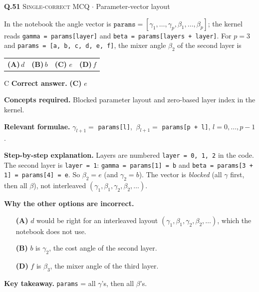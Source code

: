 \documentclass[11pt,a4paper]{article}
\newcommand{\optlabel}[1]{\textbf{(#1)}}
\newcommand{\correctlabel}[1]{\textcolor{okgreen}{\textbf{(#1)}\,\ding{51}}}
\newenvironment{qitem}[1]{\begin{list}{}{\setlength{\leftmargin}{3.3em}\setlength{\labelwidth}{3.1em}%
  \setlength{\labelsep}{0.2em}\setlength{\topsep}{3pt}\setlength{\parsep}{3pt}}\item[\textbf{Q.#1}\hfill]}{\end{list}}
\newcommand{\qsep}{\par\vspace{2pt}{\color{black!15}\hrule}\vspace{4pt}}
\newcommand{\qmeta}[2]{{\footnotesize\color{black!60}\textsc{#1} \;$\cdot$\; #2}\par}
\begin{document}
\begin{qitem}{51}
\qmeta{Single-correct MCQ}{Parameter-vector layout}
In the notebook the angle vector is $\texttt{params} = [\gamma_1, \dots, \gamma_p, \beta_1, \dots, \beta_p]$; the kernel reads
\texttt{gamma = params[layer]} and \texttt{beta = params[layers + layer]}. For $p = 3$ and
\texttt{params = [a, b, c, d, e, f]}, the mixer angle $\beta_2$ of the second layer is
\par\smallskip\noindent\begin{tabularx}{\linewidth}{@{}*{4}{L}@{}}
\optlabel{A}\,$d$ & \optlabel{B}\,$b$ & \correctlabel{C}\,$e$ & \optlabel{D}\,$f$
\end{tabularx}
\end{qitem}
\begin{solbox}{C}
\textbf{\color{brand}Correct answer.} \textcolor{okgreen}{\textbf{(C)}} $e$

\textbf{\color{brand}Concepts required.} Blocked parameter layout and zero-based layer index in the kernel.

\textbf{\color{brand}Relevant formulae.} $\gamma_{l+1} = $ \texttt{params[l]}, $\ \beta_{l+1} = $ \texttt{params[p + l]}, $l = 0, \dots, p-1$.

\textbf{\color{brand}Step-by-step explanation.} Layers are numbered \texttt{layer = 0, 1, 2} in the code. The second layer is \texttt{layer = 1}:
\texttt{gamma = params[1] = b} and \texttt{beta = params[3 + 1] = params[4] = e}.
So $\beta_2 = e$ (and $\gamma_2 = b$). The vector is \emph{blocked} (all $\gamma$ first, then all $\beta$), not interleaved
$(\gamma_1, \beta_1, \gamma_2, \beta_2, \dots)$.

\textbf{\color{brand}Why the other options are incorrect.}
\begin{itemize}[leftmargin=2.4em, itemsep=1pt, topsep=2pt]
\item[\textbf{(A)}] $d$ would be right for an interleaved layout $(\gamma_1, \beta_1, \gamma_2, \beta_2, \dots)$, which the notebook does not use.
\item[\textbf{(B)}] $b$ is $\gamma_2$, the cost angle of the second layer.
\item[\textbf{(D)}] $f$ is $\beta_3$, the mixer angle of the third layer.
\end{itemize}
\textbf{\color{brand}Key takeaway.} \texttt{params} = all $\gamma$'s, then all $\beta$'s.
\end{solbox}
\qsep
\end{document}
